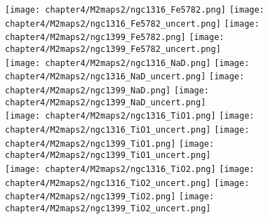 \begin{figure*}
	\centering
	\texttt{[image: chapter4/M2maps2/ngc1316\_Fe5782.png]}
	\texttt{[image: chapter4/M2maps2/ngc1316\_Fe5782\_uncert.png]}
	\texttt{[image: chapter4/M2maps2/ngc1399\_Fe5782.png]}
	\texttt{[image: chapter4/M2maps2/ngc1399\_Fe5782\_uncert.png]}
	\\
	\texttt{[image: chapter4/M2maps2/ngc1316\_NaD.png]}
	\texttt{[image: chapter4/M2maps2/ngc1316\_NaD\_uncert.png]}
	\texttt{[image: chapter4/M2maps2/ngc1399\_NaD.png]}
	\texttt{[image: chapter4/M2maps2/ngc1399\_NaD\_uncert.png]}
	\\
	\texttt{[image: chapter4/M2maps2/ngc1316\_TiO1.png]}
	\texttt{[image: chapter4/M2maps2/ngc1316\_TiO1\_uncert.png]}
	\texttt{[image: chapter4/M2maps2/ngc1399\_TiO1.png]}
	\texttt{[image: chapter4/M2maps2/ngc1399\_TiO1\_uncert.png]}
	\\
	\texttt{[image: chapter4/M2maps2/ngc1316\_TiO2.png]}
	\texttt{[image: chapter4/M2maps2/ngc1316\_TiO2\_uncert.png]}
	\texttt{[image: chapter4/M2maps2/ngc1399\_TiO2.png]}
	\texttt{[image: chapter4/M2maps2/ngc1399\_TiO2\_uncert.png]}
	\\
\end{figure*}